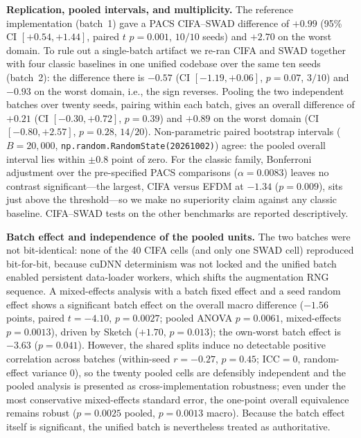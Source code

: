 \documentclass[electronics,article,submit,moreauthors]{Definitions/mdpi}
\newcommand{\add}[1]{\textcolor{addblue}{#1}}
\def\add#1{#1}%
\renewcommand{\add}[1]{#1}
\begin{document}
\textbf{Replication, pooled intervals, and multiplicity.} The reference implementation (batch~1) gave a PACS CIFA--SWAD difference of $+0.99$ (95\% CI $[+0.54,+1.44]$, paired $t$ $p=0.001$, $10/10$ seeds) and $+2.70$ on the worst domain. To rule out a single-batch artifact we re-ran CIFA and SWAD together with four classic baselines in one unified codebase over the same ten seeds (batch~2): the difference there is $-0.57$ (CI $[-1.19,+0.06]$, $p=0.07$, $3/10$) and $-0.93$ on the worst domain, i.e., the sign reverses. Pooling the two independent batches over twenty seeds, pairing within each batch, gives an overall difference of $+0.21$ (CI $[-0.30,+0.72]$, $p=0.39$) and $+0.89$ on the worst domain (CI $[-0.80,+2.57]$, $p=0.28$, $14/20$). Non-parametric paired bootstrap intervals ($B=20{,}000$, \texttt{np.random.RandomState(20261002)}) agree: the pooled overall interval lies within $\pm0.8$ point of zero. For the classic family, Bonferroni adjustment over the pre-specified PACS comparisons ($\alpha=0.0083$) leaves no contrast significant---the largest, CIFA versus EFDM at $-1.34$ ($p=0.009$), sits just above the threshold---so we make no superiority claim against any classic baseline. CIFA--SWAD tests on the other benchmarks are reported descriptively.

\add{\textbf{Batch effect and independence of the pooled units.} The two batches were not bit-identical: none of the 40 CIFA cells (and only one SWAD cell) reproduced bit-for-bit, because cuDNN determinism was not locked and the unified batch enabled persistent data-loader workers, which shifts the augmentation RNG sequence. A mixed-effects analysis with a batch fixed effect and a seed random effect shows a significant batch effect on the overall macro difference ($-1.56$ points, paired $t=-4.10$, $p=0.0027$; pooled ANOVA $p=0.0061$, mixed-effects $p=0.0013$), driven by Sketch ($+1.70$, $p=0.013$); the own-worst batch effect is $-3.63$ ($p=0.041$). However, the shared splits induce no detectable positive correlation across batches (within-seed $r=-0.27$, $p=0.45$; ICC$=0$, random-effect variance $0$), so the twenty pooled cells are defensibly independent and the pooled analysis is presented as cross-implementation robustness; even under the most conservative mixed-effects standard error, the one-point overall equivalence remains robust ($p=0.0025$ pooled, $p=0.0013$ macro). Because the batch effect itself is significant, the unified batch is nevertheless treated as authoritative.}
\end{document}
